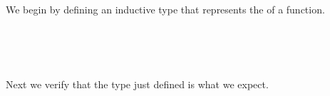 We begin by defining an inductive type that represents the  of a function.
\ccpad
\begin{code}%
\>[0][@{}l@{\AgdaIndent{0}}]%
\>[1]\AgdaSpace{}%
\AgdaSpace{}%
\AgdaSymbol{\{}\AgdaSpace{}%
\AgdaSymbol{:}\AgdaSpace{}%
\AgdaSpace{}%
\AgdaSpace{}%
\AgdaSymbol{\}\{}\AgdaSpace{}%
\AgdaSymbol{:}\AgdaSpace{}%
\AgdaSpace{}%
\AgdaSpace{}%
\AgdaSymbol{\}(}\AgdaSpace{}%
\AgdaSymbol{:}\AgdaSpace{}%
\AgdaSpace{}%
\AgdaSpace{}%
\AgdaSymbol{)}\AgdaSpace{}%
\AgdaSymbol{:}\AgdaSpace{}%
\AgdaSpace{}%
\AgdaSpace{}%
\AgdaSpace{}%
\AgdaSpace{}%
\AgdaSpace{}%
\<%
\\
\>[1][@{}l@{\AgdaIndent{0}}]%
\>[2]\<%
\\
%
\>[2]\AgdaSpace{}%
\AgdaSymbol{:}\AgdaSpace{}%
\AgdaSymbol{(}\AgdaSpace{}%
\AgdaSymbol{:}\AgdaSpace{}%
\AgdaSymbol{)}\AgdaSpace{}%
\AgdaSpace{}%
\AgdaSpace{}%
\AgdaSpace{}%
\AgdaSpace{}%
\AgdaSpace{}%
\<%
\\
%
\>[2]\AgdaSpace{}%
\AgdaSymbol{:}\AgdaSpace{}%
\AgdaSymbol{(}\AgdaSpace{}%
\AgdaSymbol{:}\AgdaSpace{}%
\AgdaSymbol{)}\AgdaSpace{}%
\AgdaSpace{}%
\AgdaSymbol{(}\AgdaSpace{}%
\AgdaSymbol{:}\AgdaSpace{}%
\AgdaSymbol{)}\AgdaSpace{}%
\AgdaSpace{}%
\AgdaSpace{}%
\AgdaSpace{}%
\AgdaSpace{}%
\AgdaSpace{}%
\AgdaSpace{}%
\AgdaSpace{}%
\AgdaSpace{}%
\AgdaSpace{}%
\<%
\end{code}
\ccpad
Next we verify that the type just defined is what we expect.
\ccpad
